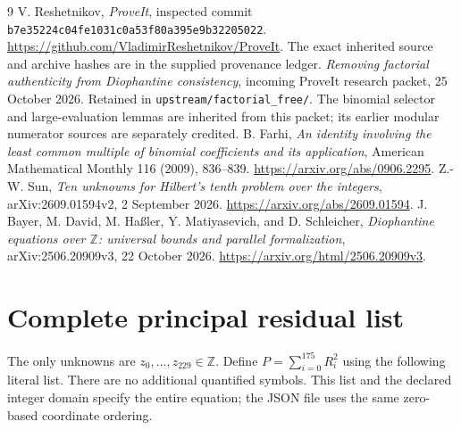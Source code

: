 \documentclass[11pt]{article}
\theoremstyle{remark}\newtheorem{remark}[theorem]{Remark}
\newcommand{\Z}{\mathbb Z}\newcommand{\N}{\mathbb N}
\newcommand{\MainLastRow}{175}
\newcommand{\MainLastVar}{229}
\begin{document}
\begin{thebibliography}{9}
 V. Reshetnikov, \emph{ProveIt}, inspected commit
\texttt{b7e35224c04fe1031c0a53f80a395e9b32205022}.
\url{https://github.com/VladimirReshetnikov/ProveIt}.
The exact inherited source and archive hashes are in the supplied provenance ledger.
 \emph{Removing factorial authenticity from
Diophantine consistency}, incoming ProveIt research packet,
25 October 2026. Retained in \nolinkurl{upstream/factorial_free/}.
The binomial selector and large-evaluation lemmas are inherited from
this packet; its earlier modular numerator sources are separately credited.
 B. Farhi, \emph{An identity involving the least common
multiple of binomial coefficients and its application},
American Mathematical Monthly 116 (2009), 836--839.
\url{https://arxiv.org/abs/0906.2295}.
 Z.-W. Sun, \emph{Ten unknowns for Hilbert's tenth
problem over the integers}, arXiv:2609.01594v2, 2 September 2026.
\url{https://arxiv.org/abs/2609.01594}.
 J. Bayer, M. David, M. Ha\ss ler, Y. Matiyasevich,
and D. Schleicher, \emph{Diophantine equations over $\Z$: universal
bounds and parallel formalization}, arXiv:2506.20909v3,
22 October 2026. \url{https://arxiv.org/html/2506.20909v3}.
\end{thebibliography}

\clearpage\appendix
\section{Complete principal residual list}\label{app:residuals}

The only unknowns are $z_0,\ldots,z_{\MainLastVar}\in\Z$.
Define $P=\sum_{i=0}^{\MainLastRow}R_i^2$ using the following
literal list. There are no additional quantified symbols. This list
and the declared integer domain specify the entire equation; the
JSON file uses the same zero-based coordinate ordering.
\end{document}
